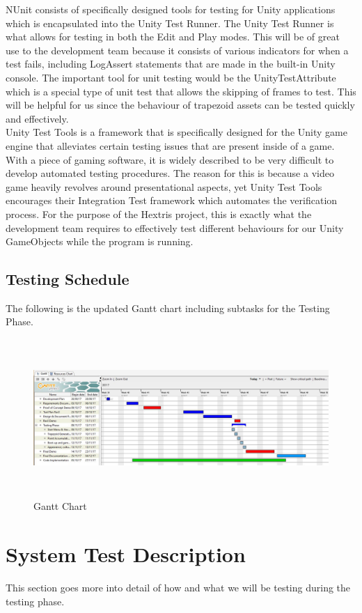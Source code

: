 \documentclass[12pt, titlepage]{article}
\begin{document}
NUnit consists of specifically designed tools for testing for Unity applications which is encapsulated into the Unity Test Runner. The Unity Test Runner is what allows for testing in both the Edit and Play modes. This will be of great use to the development team because it consists of various indicators for when a test fails, including LogAssert statements that are made in the built-in Unity console. The important tool for unit testing would be the UnityTestAttribute which is a special type of unit test that allows the skipping of frames to test. This will be helpful for us since the behaviour of trapezoid assets can be tested quickly and effectively. \\

Unity Test Tools is a framework that is specifically designed for the Unity game engine that alleviates certain testing issues that are present inside of a game. With a piece of gaming software, it is widely described to be very difficult to develop automated testing procedures. The reason for this is because a video game heavily revolves around presentational aspects, yet Unity Test Tools encourages their Integration Test framework which automates the verification process. For the purpose of the Hextris project, this is exactly what the development team requires to effectively test different behaviours for our Unity GameObjects while the program is running. 

\subsection{Testing Schedule}
\noindent The following is the updated Gantt chart including subtasks for the Testing Phase.
\begin{figure}[h!]
\centering
\includegraphics[width = 14cm, height = 6cm]{GanttChart}
\caption{Gantt Chart}
\end{figure}


\section{System Test Description}
\noindent This section goes more into detail of how and what we will be testing during the testing phase.
\end{document}
